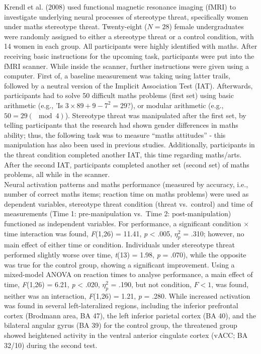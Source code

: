\documentclass[
  stu,floatsintext]{apa7}
\begin{document}
Krendl et al. (2008) used functional magnetic resonance imaging (fMRI) to investigate underlying neural processes of stereotype threat, specifically women under maths stereotype threat.
Twenty-eight (\(N = 28\)) female undergraduates were randomly assigned to either a stereotype threat or a control condition, with 14 women in each group.
All participants were highly identified with maths.
After receiving basic instructions for the upcoming task, participants were put into the fMRI scanner.
While inside the scanner, further instructions were given using a computer.
First of, a baseline measurement was taking using latter trails, followed by a neutral version of the Implicit Association Test (IAT).
Afterwards, participants had to solve 50 difficult maths problems (first set) using basic arithmetic (e.g., 'Is \(3 \times 89+9-7^2 = 29\)?), or modular arithmetic (e.g., \(50 = 29(\mod{4})\)).
Stereotype threat was manipulated after the first set, by telling participants that the research had shown gender differences in maths ability; thus, the following task was to measure ``maths attitudes'' - this manipulation has also been used in previous studies.
Additionally, participants in the threat condition completed another IAT, this time regarding maths/arts.
After the second IAT, participants completed another set (second set) of maths problems, all while in the scanner.\\
Neural activation patterns and maths performance (measured by accuracy, i.e., number of correct maths items; reaction time on maths problems) were used as dependent variables, stereotype threat condition (threat vs.~control) and time of measurements (Time 1: pre-manipulation vs.~Time 2: post-manipulation) functioned as independent variables.
For performance, a significant condition \(\times\) time interaction was found, \emph{F}(1,26) = 11.41, \emph{p} \textless{} .005, \(\eta^{2}_{p}\) = .310; however, no main effect of either time or condition.
Individuals under stereotype threat performed slightly worse over time, \emph{t}(13) = 1.98, \emph{p} = .070), while the opposite was true for the control group, showing a significant improvement.
Using a mixed-model ANOVA on reaction times to analyse performance, a main effect of time, \emph{F}(1,26) = 6.21, \emph{p} \textless{} .020, \(\eta^{2}_{p}\) = .190, but not condition, \(F < 1\), was found, neither was an interaction, \emph{F}(1,26) = 1.21, \emph{p} = .280.
While increased activation was found in several left-lateralized regions, including the inferior prefrontal cortex (Brodmann area, BA 47), the left inferior parietal cortex (BA 40), and the bilateral angular gyrus (BA 39) for the control group, the threatened group showed heightened activity in the ventral anterior cingulate cortex (vACC; BA 32/10) during the second test.
\end{document}
